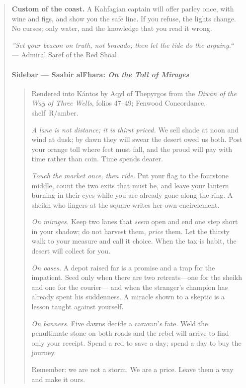 \documentclass[11pt]{article}
\begin{document}
\begin{quote}
\medskip
\noindent\textbf{Custom of the coast.} A Kahfagian captain will offer parley once, with wine and figs, and show you the safe line. If you refuse, the lights change. No curses; only water, and the knowledge that you read it wrong.

\medskip
\noindent\textit{''Set your beacon on truth, not bravado; then let the tide do the arguing.``} --- Admiral Saref of the Red Shoal

\clearpage

\paragraph*{Sidebar --- Saabir al\textendash Fhara: \textit{On the Toll of Mirages}}
\begin{quote}\small
Rendered into Kántos by Aqyl of Thepyrgos from the \textit{Diwān of the Way of Three Wells}, folios 47--49; Fenwood Concordance, shelf~R/amber.

\medskip
\textit{A lane is not distance; it is thirst priced.} We sell shade at noon and wind at dusk; by dawn they will swear the desert owed us both. Post your orange toll where feet must fall, and the proud will pay with time rather than coin. Time spends dearer.

\medskip
\textit{Touch the market once, then ride.} Put your flag to the four\textendash stone middle, count the two exits that must be, and leave your lantern burning in their eyes while you are already gone along the ring. A sheikh who lingers at the square writes her own encirclement.

\medskip
\textit{On mirages.} Keep two lanes that \emph{seem} open and end one step short in your shadow; do not harvest them, \emph{price} them. Let the thirsty walk to your measure and call it choice. When the tax is habit, the desert will collect for you.

\medskip
\textit{On oases.} A depot raised far is a promise and a trap for the impatient. Seed only when there are two retreats---one for the sheikh and one for the courier--- and when the stranger's champion has already spent his suddenness. A miracle shown to a skeptic is a lesson taught against yourself.

\medskip
\textit{On banners.} Five dawns decide a caravan's fate. Weld the penultimate stone on both roads and the rebel will arrive to find only your receipt. Spend a red to save a day; spend a day to buy the journey.

\medskip
Remember: we are not a storm. We are a price. Leave them a way and make it ours.
\end{quote}


\end{quote}
\end{document}

